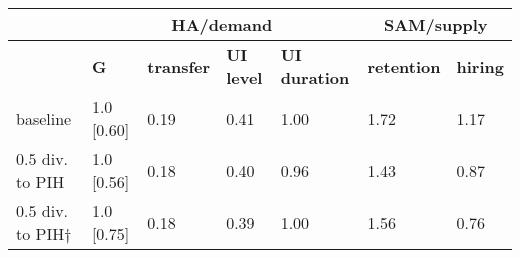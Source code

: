 \begin{tabular}{lllllll}
\multicolumn{1}{c}{}& \multicolumn{4}{c}{\textbf{HA/demand}} & \multicolumn{2}{c}{\textbf{SAM/supply}}\\
\toprule
 & \textbf{G} & \textbf{transfer}  & \textbf{UI level} & \textbf{UI duration} & \textbf{retention} & \textbf{hiring}\\
\midrule
baseline & 1.0 [0.60] & \color{gray}0.19  & \color{gray}0.41 & \color{gray}1.00 & 1.72 & 1.17\\
$0.5$ div. to PIH & 1.0 [0.56] & \color{gray}0.18  & \color{gray}0.40 & \color{gray}0.96 & 1.43 & 0.87\\
$0.5$ div. to PIH$\dagger$ & 1.0 [0.75] & \color{gray}0.18  & \color{gray}0.39 & \color{gray}1.00 & 1.56 & 0.76\\
\bottomrule
\end{tabular}
